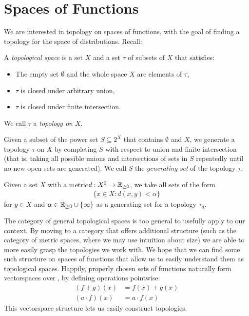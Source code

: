     \section{Spaces of Functions}
      \label{sec:spcoffunc}
      We are interested in topology on spaces of functions, with the goal of finding a topology for the space of distributions.
      Recall:
      \begin{defn}
        A \emph{topological space} is a set $X$ and a set $\tau$ of subsets of $X$ that satisfies:
        \begin{itemize}
          \item The empty set $\emptyset$ and the whole space $X$ are elements of $\tau$,
          \item $\tau$ is closed under arbitrary union,
          \item $\tau$ is closed under finite intersection.
        \end{itemize}
        We call $\tau$ a \emph{topology on $X$}.

        Given a subset of the power set $S\subseteq2^X$ that contains $\emptyset$ and $X$, we generate a topology $\tau$ on $X$ by completing $S$ with respect to union and finite intersection (that is, taking all possible unions and intersections of sets in $S$ repeatedly until no new open sets are generated).
        We call $S$ the \emph{generating set} of the topology $\tau$.

        Given a set $X$ with a metric\footnotemark $d:X^2\rightarrow\mathbb{R}_{\ge 0}$, we take all sets of the form 
        \begin{align*}
          \{x\in X:d(x,y)<\alpha\}
        \end{align*}
        for $y\in X$ and $\alpha\in\mathbb{R}_{\ge0}\cup\{\infty\}$ as a generating set for a topology $\tau_d$.
      \end{defn}

      The category of general topological spaces is too general to usefully apply to our context.
      By moving to a category that offers additional structure (such as the category of metric spaces, where we may use intuition about size) we are able to more easily grasp the topologies we work with.
      We hope that we can find some such structure on spaces of functions that allow us to easily understand them as topological spaces.
      Happily, properly chosen sets of functions naturally form vectorspaces over \C, by defining operations pointwise:
      \begin{align*}
        (f+g)(x) &= f(x)+g(x)\\
        (a\cdot f)(x) &= a\cdot f(x)
      \end{align*}
      This vectorspace structure lets us easily construct topologies.

